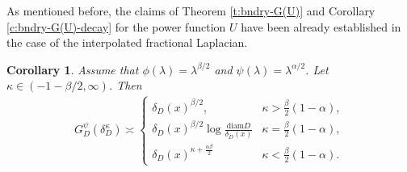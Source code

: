 \documentclass[12pt,a4paper,onecolumn]{article}
\newtheorem{cor}[thm]{Corollary}
\theoremstyle{definition}
\newcommand{\1}{\mathbf 1}
\newcommand{\de}{\delta_D}
\newcommand{\GDP}{G_D^\psi}
\newcommand{\diam}{\textrm{diam}}
\numberwithin{equation}{section}
\begin{document}
    As mentioned before, the claims of Theorem \ref{t:bndry-G(U)} and Corollary \ref{c:bndry-G(U)-decay} for the power function $U$ have been already established in the case of the interpolated fractional Laplacian. 
    \begin{cor}\label{c:bndry behav of G(de^k)} Assume that $\phi(\lambda)=\lambda^{\beta/2}$ and $\psi(\lambda)=\lambda^{\alpha/2}$.	Let $\kappa\in(-1-\beta/2,\infty)$. Then
		\begin{align*}
			\GDP(\de^\kappa)\asymp\begin{cases}
				\de(x)^{\beta/2},&\kappa>\frac{\beta}{2}(1-\alpha),\\
				\de(x)^{\beta/2}\log\frac{\diam D}{\de(x)}&\kappa=\frac{\beta}{2}(1-\alpha),\\
				\de(x)^{\kappa+\frac{\alpha\beta}{2}}&\kappa<\frac{\beta}{2}(1-\alpha).
			\end{cases}
		\end{align*}
	\end{cor}
\end{document}
